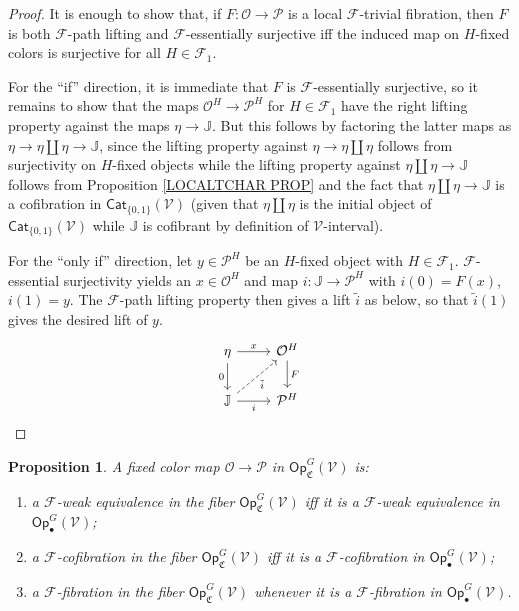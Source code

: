 \documentclass[a4paper,10pt
,draft
]{article}%
\numberwithin{equation}{section}
\numberwithin{figure}{section}
\newtheorem{proposition}[equation]{Proposition}%
\theoremstyle{definition} %
\newcommand{\F}{\ensuremath{\mathcal F}}
\newcommand{\V}{\ensuremath{\mathcal V}}
\renewcommand{\O}{\ensuremath{\mathcal O}}
\renewcommand{\P}{\ensuremath{\mathcal P}}
\newcommand{\1}{\ensuremath{\mathbbm 1}}%
\begin{document}
\begin{proof}
It is enough to show that,
if $F \colon \O \to \P$ is a local $\F$-trivial fibration,
then $F$ is both $\F$-path lifting and $\F$-essentially surjective
iff  the induced map on $H$-fixed colors is surjective for all $H \in \F_1$.


For the ``if'' direction, it is immediate that $F$ is
$\F$-essentially surjective, so it remains to show that
the maps $\O^H\to \P^H$ for $H \in \F_1$
have the right lifting property against the maps
$\eta \to \mathbb{J}$.
But this follows by factoring the latter maps as
$\eta \to \eta \amalg \eta \to \mathbb{J}$, 
since the lifting property against 
$\eta \to \eta \amalg \eta$ follows from surjectivity on $H$-fixed objects while the lifting property against
$\eta \amalg \eta \to \mathbb{J}$
follows from Proposition \ref{LOCALTCHAR PROP}
and the fact that 
$\eta \amalg \eta \to \mathbb{J}$
is a cofibration in $\mathsf{Cat}_{\{0,1\}}(\V)$
(given that $\eta \amalg \eta$ is the initial object of $\mathsf{Cat}_{\{0,1\}}(\V)$
while $\mathbb{J}$ is cofibrant by definition of $\V$-interval).

For the ``only if'' direction, let $y \in \P^H$ be an $H$-fixed object with $H \in \F_1$.
$\F$-essential surjectivity yields an $x \in \O^H$ and map 
$i \colon \mathbb{J} \to \P^H$
with $i(0)=F(x)$, $i(1)=y$.
The $\F$-path lifting property then gives a lift $\tilde{i}$ as below, 
so that $\tilde{i}(1)$ gives the desired lift of $y$.
\[
\begin{tikzcd}
	\eta \ar{d}[swap]{0} \ar{r}{x}  
&
	\O^H \arrow{d}{F}
\\
	\mathbb{J} \ar{r}[swap]{i} \ar[dashed]{ru}[swap]{\tilde{i}}
&
	\P^H
\end{tikzcd}
\]   
\end{proof}



\begin{proposition}\label{FIBERGLMOD PROP}
A fixed color map
$\O \to \P$ in 
$\mathsf{Op}^G_{\mathfrak{C}}(\V)$ is:
\begin{enumerate}[label=(\roman*)]
\item a $\F$-weak equivalence in the fiber
$\mathsf{Op}_{\mathfrak{C}}^G(\V)$
iff it is a $\F$-weak equivalence in
$\mathsf{Op}_{\bullet}^G(\V)$;
\item a $\F$-cofibration in the fiber 
$\mathsf{Op}_{\mathfrak{C}}^G(\V)$
iff it is a $\F$-cofibration in
$\mathsf{Op}_{\bullet}^G(\V)$;
\item a $\F$-fibration in the fiber 
$\mathsf{Op}_{\mathfrak{C}}^G(\V)$
whenever it is a $\F$-fibration in
$\mathsf{Op}_{\bullet}^G(\V)$.
\end{enumerate}
\end{proposition}
\end{document}
